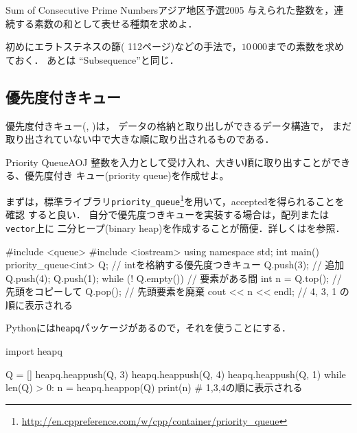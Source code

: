 \begin{pbox}{Sum of Consecutive Prime Numbers}{アジア地区予選2005}
与えられた整数を，連続する素数の和として表せる種類を求めよ．

\end{pbox}

初めにエラトステネスの篩(\pccbook{} 112ページ)などの手法で，$10\,000$までの素数を求めておく．
あとは
``Subsequence''と同じ．

\subsection{優先度付きキュー}\label{section:priority-queue}
優先度付きキュー(, \pccbook[p.~32])は，
データの格納と取り出しができるデータ構造で，
まだ取り出されていない中で大きな順に取り出されるものである．

\begin{psbox}{Priority Queue}{AOJ}
整数を入力として受け入れ、大きい順に取り出すことができる、優先度付き
キュー(priority queue)を作成せよ。

\end{psbox}

まずは，標準ライブラリ\texttt{priority\_queue}\footnote{\url{http://en.cppreference.com/w/cpp/container/priority_queue}}を用いて，acceptedを得られることを確認
すると良い．
自分で優先度つきキューを実装する場合は，配列または\texttt{vector}上に
二分ヒープ(binary heap)を作成することが簡便．詳しくは\pcaojbook[10章，pp.~232--]を参照．

\begin{cbox}[emph={queue,priority_queue,push,top,pop}]
#include <queue>
#include <iostream>
using namespace std;
int main() {
    priority_queue<int> Q; // intを格納する優先度つきキュー
    Q.push(3); // 追加
    Q.push(4);
    Q.push(1);
    while (! Q.empty()) { // 要素がある間
	int n = Q.top(); // 先頭をコピーして
	Q.pop(); // 先頭要素を廃棄
	cout << n << endl; // 4, 3, 1  の順に表示される
    }
}
\end{cbox}

Pythonには\texttt{heapq}パッケージがあるので，それを使うことにする．
\begin{pybox}
import heapq

Q = []
heapq.heappush(Q, 3)
heapq.heappush(Q, 4)
heapq.heappush(Q, 1)
while len(Q) > 0:
    n = heapq.heappop(Q)
    print(n)                    # 1,3,4の順に表示される
\end{pybox}



